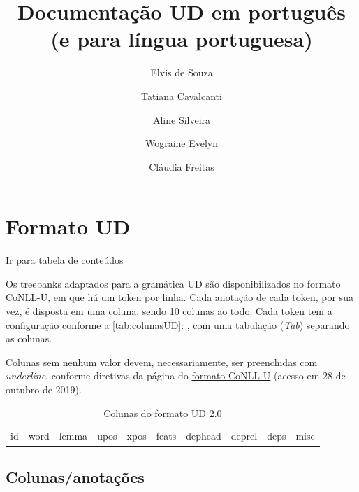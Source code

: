 \documentclass[output=paper,colorlinks,citecolor=brown]{langscibook}
\author{Elvis de Souza\affiliation{PUC-Rio, Brasil}\and Tatiana Cavalcanti\and Aline Silveira\and Wograine Evelyn\and Cláudia Freitas}
\title{Documentação UD em português\\
(e para língua portuguesa)}
\newcommand*{\fullref}[1]{\hyperref[{#1}]{\autoref*{#1}: \nameref*{#1}}} %
\begin{document}
\maketitle


\tableofcontents

\chapter{Formato UD}\label{sec:formatoud}

\hyperlink{toc}{Ir para tabela de conteúdos\\}

Os treebanks adaptados para a gramática UD são disponibilizados no formato CoNLL-U, em que há um token por linha. Cada anotação de cada token, por sua vez, é disposta em uma coluna, sendo 10 colunas ao todo. Cada token tem a configuração conforme a \fullref{tab:colunasUD}, com uma tabulação (\textit{Tab}) separando as colunas.

Colunas sem nenhum valor devem, necessariamente, ser preenchidas com \textit{underline}, conforme diretivas da página do \href{https://universaldependencies.org/format}{formato CoNLL-U} (acesso em 28 de outubro de 2019).

\begin{table}
    \centering
    \begin{tabular}{c c c c c c c c c c}
        id & word & lemma & upos & xpos & feats & dephead & deprel & deps & misc\\
    \end{tabular}
    \caption{Colunas do formato UD 2.0}
    \label{tab:colunasUD}
\end{table}

\section{Colunas/anotações}\label{sec:colunas}
\end{document}

